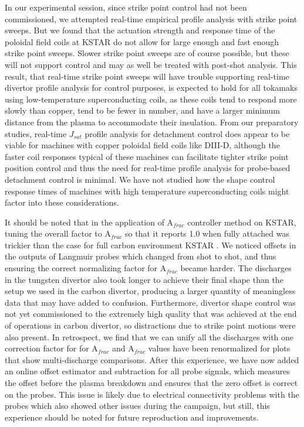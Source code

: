 \documentclass[10pt]{iopart}
\newcommand{\Afrac}{A$_{frac}$}
\begin{document}
In our experimental session, since strike point control had not been commissioned, we attempted real-time empirical profile analysis with strike point sweeps.
But we found that the actuation strength and response time of the poloidal field coils at KSTAR do not allow for large enough and fast enough strike point sweeps.
Slower strike point sweeps are of course possible, but these will not support control and may as well be treated with post-shot analysis.
This result, that real-time strike point sweeps will have trouble supporting real-time divertor profile analysis for control purposes, is expected to hold for all tokamaks using low-temperature superconducting coils, as these coils tend to respond more slowly than copper, tend to be fewer in number, and have a larger minimum distance from the plasma to accommodate their insulation.
From our preparatory studies, real-time $J_{sat}$ profile analysis for detachment control does appear to be viable for machines with copper poloidal field coils like \mbox{DIII-D}, although the faster coil responses typical of these machines can facilitate tighter strike point position control and thus the need for real-time profile analysis for probe-based detachment control is minimal.
We have not studied how the shape control response times of machines with high temperature superconducting coils might factor into these considerations.

It should be noted that in the application of \Afrac{} controller method on KSTAR, tuning the overall factor to \Afrac{} so that it reports 1.0 when fully attached was trickier than the case for full carbon environment KSTAR \cite{Eldon_2022_PPCF}.
We noticed offsets in the outputs of Langmuir probes which changed from shot to shot, and thus ensuring the correct normalizing factor for \Afrac{} became harder.
The discharges in the tungsten divertor also took longer to achieve their final shape than the setup we used in the carbon divertor, producing a larger quantity of meaningless data that may have added to confusion.
Furthermore, divertor shape control was not yet commissioned to the extremely high quality that was achieved at the end of operations in carbon divertor, so distractions due to strike point motions were also present.
In retrospect, we find that we can unify all the discharges with one correction factor for for \Afrac{} and \Afrac{} values have been renormalized for plots that show multi-discharge comparisons.
After this experience, we have now added an online offset estimator and subtraction for all probe signals, which measures the offset before the plasma breakdown and ensures that the zero offset is correct on the probes.
This issue is likely due to electrical connectivity problems with the probes which also showed other issues during the campaign, but still, this experience should be noted for future reproduction and improvements.
\end{document}
